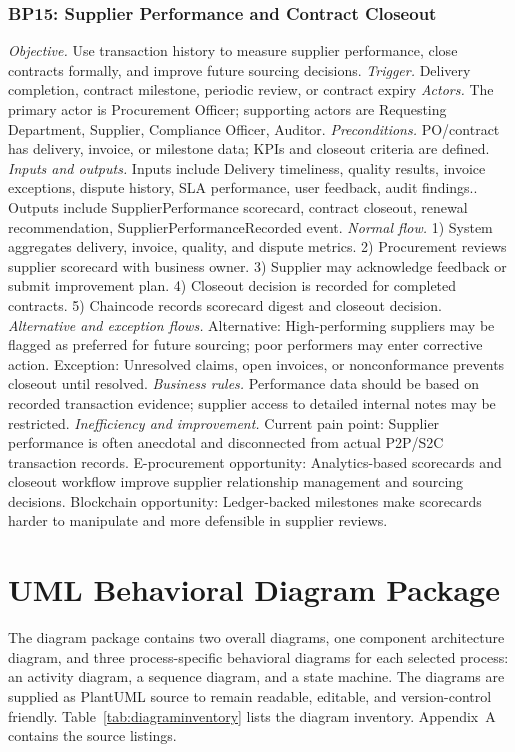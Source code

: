 \documentclass[conference]{IEEEtran}
\begin{document}
\subsubsection{BP15: Supplier Performance and Contract Closeout}
\textit{Objective.} Use transaction history to measure supplier performance, close contracts formally, and improve future sourcing decisions.
\textit{Trigger.} Delivery completion, contract milestone, periodic review, or contract expiry
\textit{Actors.} The primary actor is Procurement Officer; supporting actors are Requesting Department, Supplier, Compliance Officer, Auditor.
\textit{Preconditions.} PO/contract has delivery, invoice, or milestone data; KPIs and closeout criteria are defined.
\textit{Inputs and outputs.} Inputs include Delivery timeliness, quality results, invoice exceptions, dispute history, SLA performance, user feedback, audit findings.. Outputs include SupplierPerformance scorecard, contract closeout, renewal recommendation, SupplierPerformanceRecorded event.
\textit{Normal flow.} 1) System aggregates delivery, invoice, quality, and dispute metrics. 2) Procurement reviews supplier scorecard with business owner. 3) Supplier may acknowledge feedback or submit improvement plan. 4) Closeout decision is recorded for completed contracts. 5) Chaincode records scorecard digest and closeout decision.
\textit{Alternative and exception flows.} Alternative: High-performing suppliers may be flagged as preferred for future sourcing; poor performers may enter corrective action. Exception: Unresolved claims, open invoices, or nonconformance prevents closeout until resolved.
\textit{Business rules.} Performance data should be based on recorded transaction evidence; supplier access to detailed internal notes may be restricted.
\textit{Inefficiency and improvement.} Current pain point: Supplier performance is often anecdotal and disconnected from actual P2P/S2C transaction records. E-procurement opportunity: Analytics-based scorecards and closeout workflow improve supplier relationship management and sourcing decisions. Blockchain opportunity: Ledger-backed milestones make scorecards harder to manipulate and more defensible in supplier reviews.


\section{UML Behavioral Diagram Package}
The diagram package contains two overall diagrams, one component architecture diagram, and three process-specific behavioral diagrams for each selected process: an activity diagram, a sequence diagram, and a state machine. The diagrams are supplied as PlantUML source to remain readable, editable, and version-control friendly. Table~\ref{tab:diagraminventory} lists the diagram inventory. Appendix~A contains the source listings.
\end{document}
